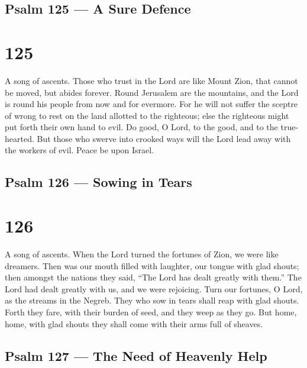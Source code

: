 \hypertarget{psalm-125-a-sure-defence}{%
\subsection{Psalm 125 --- A Sure
Defence}\label{psalm-125-a-sure-defence}}

\hypertarget{section-124}{%
\section{125}\label{section-124}}

A song of ascents.  Those who trust in the Lord are like
Mount Zion, that cannot be moved, but abides forever.  Round
Jerusalem are the mountains, and the Lord is round his people from now
and for evermore.  For he will not suffer the sceptre of
wrong to rest on the land allotted to the righteous; else the righteous
might put forth their own hand to evil.  Do good, O Lord, to
the good, and to the true-hearted.  But those who swerve
into crooked ways will the Lord lead away with the workers of evil.
Peace be upon Israel.

\hypertarget{psalm-126-sowing-in-tears}{%
\subsection{Psalm 126 --- Sowing in
Tears}\label{psalm-126-sowing-in-tears}}

\hypertarget{section-125}{%
\section{126}\label{section-125}}

A song of ascents.  When the Lord turned the fortunes of
Zion, we were like dreamers.  Then was our mouth filled with
laughter, our tongue with glad shouts; then amongst the nations they
said, ``The Lord has dealt greatly with them.''  The Lord
had dealt greatly with us, and we were rejoicing.  Turn our
fortunes, O Lord, as the streams in the Negreb.  They who
sow in tears shall reap with glad shouts.  Forth they fare,
with their burden of seed, and they weep as they go. But home, home,
with glad shouts they shall come with their arms full of sheaves.

\hypertarget{psalm-127-the-need-of-heavenly-help}{%
\subsection{Psalm 127 --- The Need of Heavenly
Help}\label{psalm-127-the-need-of-heavenly-help}}

